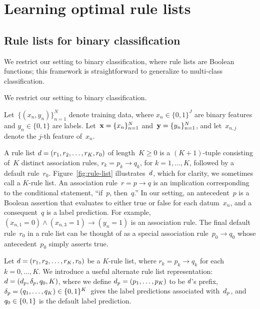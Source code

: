 \section{Learning optimal rule lists}

\subsection{Rule lists for binary classification}
\label{sec:setup}

\begin{arxiv}
We restrict our setting to binary classification,
where rule lists are Boolean functions;
this framework is straightforward to generalize to multi-class classification.
\end{arxiv}
\begin{kdd}
We restrict our setting to binary classification.
\end{kdd}
%
Let~${\{(x_n, y_n)\}_{n=1}^N}$ denote training data,
where ${x_n \in \{0, 1\}^J}$ are binary features and ${y_n \in \{0, 1\}}$ are labels.
%
Let~${\mathbf{x} = \{x_n\}_{n=1}^N}$ and~${\mathbf{y} = \{y_n\}_{n=1}^N}$,
and let~${x_{n,j}}$ denote the $j$-th feature of~$x_n$.

A rule list ${{d} = (r_1, r_2, \dots, r_K, r_0)}$ of length~${K \ge 0}$
is a ${(K+1)}$-tuple consisting of~$K$ distinct association rules,
${r_k = p_k \rightarrow q_k}$, for ${k = 1, \dots, K}$,
followed by a default rule~$r_0$.
%
Figure~\ref{fig:rule-list} illustrates~${d}$,
which for clarity, we sometimes call a $K$-rule list.
%
An association rule~${r = p \rightarrow q}$ is an implication
corresponding to the conditional statement, ``if~$p$, then~$q$.''
%
In our setting, an antecedent~$p$ is a Boolean assertion that
evaluates to either true or false for each datum~$x_n$,
and a consequent~$q$ is a label prediction.
%
For example, ${(x_{n, 1} = 0) \wedge (x_{n, 3} = 1) \rightarrow (y_n = 1)}$
is an association rule.
%
%
The final default rule~$r_0$ in a rule list can be thought of
as a special association rule~${p_0 \rightarrow q_0}$
whose antecedent~$p_0$ simply asserts true.

Let ${{d} = (r_1, r_2, \dots, r_K, r_0)}$ be a $K$-rule list,
where ${r_k = p_k \rightarrow q_k}$ for each ${k = 0, \dots, K}$.
%
We introduce a useful alternate rule list representation:
${{d} = (d_p, \delta_p, q_0, K)}$,
where we define ${d_p = (p_1, \dots, p_K)}$ to be ${d}$'s prefix,
${\delta_p = (q_1, \dots, q_K) \in \{0, 1\}^K}$~gives
the label predictions associated with~$d_p$,
and ${q_0 \in \{0, 1\}}$ is the default label prediction.

